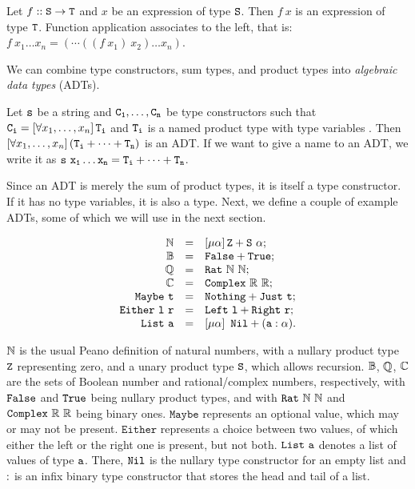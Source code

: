 \begin{definition}
	Let $f :: \mathtt{S} \rightarrow \mathtt{T}$ and $x$ be an expression of type $\mathtt{S}$. Then $f\ x$ is an expression of type $\mathtt{T}$. Function application associates to the left, that is: $f\ x_1 \dots x_n = (\cdots((f\ x_1)\ x_2) \dots x_n)$.
\end{definition}

\noindent
We can combine type constructors, sum types, and product types into {\em algebraic data types} (ADTs).

\begin{definition}\label{def:ADT}
	Let $\mathtt{s}$ be a string and $\mathtt{C_1},\dots,\mathtt{C_n}$ be type constructors such that $\mathtt{C_i} = \left[\forall x_1,\dots,x_n \right] \mathtt{T_i}$ and $\mathtt{T_i}$ is a named product type with type variables . Then $\left[\forall x_1,\dots,x_n \right] (\mathtt{T_i} + \dots + \mathtt{T_n})$ is an ADT. If we want to give a name to an ADT, we write it as $\mathtt{s\ x_1 \dots x_n = T_i + \dots + T_n}$.
\end{definition}

Since an ADT is merely the sum of product types, it is itself a type constructor. If it has no type variables, it is also a type. Next, we define a couple of example ADTs, some of which we will use in the next section.

\begin{example}
	$$
	\begin{array}{r c l}
	\mathbb{N} & = & \left[\mu \alpha \right]\mathtt{Z + S\ \alpha};\\ 
	\mathbb{B} & = & \mathtt{False + True};\\
	\mathbb{Q} & = & \mathtt{Rat}\ \mathbb{N}\ \mathbb{N};\\
	\mathbb{C} & = & \mathtt{Complex}\ \mathbb{R}\ \mathbb{R};\\
	\mathtt{Maybe\ t} & = & \mathtt{Nothing + Just\ t};\\
	\mathtt{Either\ l\ r} & = & \mathtt{Left\ l + Right\ r};\\
	\mathtt{List\ a} & = & \left[\mu \alpha \right]\ \mathtt{Nil + (a : \alpha)}.\\
	\end{array}
	$$
	
	$\mathbb{N}$ is the usual Peano definition of natural numbers, with a nullary product type $\mathtt{Z}$ representing zero, and a unary product type $\mathtt{S}$, which allows recursion. $\mathbb{B}$, $\mathbb{Q}$, $\mathbb{C}$ are the sets of Boolean number and rational/complex numbers, respectively, with $\mathtt{False}$ and $\mathtt{True}$ being nullary product types, and with $\mathtt{Rat}\ \mathbb{N}\ \mathbb{N}$ and $\mathtt{Complex}\ \mathbb{R}\ \mathbb{R}$ being binary ones. $\mathtt{Maybe}$ represents an optional value, which may or may not be present. $\mathtt{Either}$ represents a choice between two values, of which either the left or the right one is present, but not both. $\mathtt{List\ a}$  denotes a list of values of type $\mathtt{a}$. There, $\mathtt{Nil}$ is the nullary type constructor for an empty list and $\mathtt{:}$ is an infix binary type constructor that stores the head and tail of a list.
\end{example}


